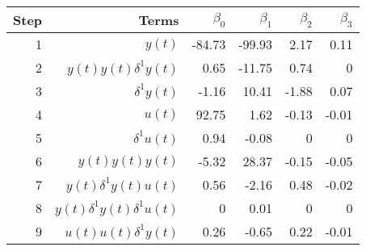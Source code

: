 \begin{tabular}{rrrrrr}
Step & Terms & $\beta_{0}$ & $\beta_{1}$ & $\beta_{2}$ & $\beta_{3}$ \\ 
\hline 
1 & $y(t)$ & -84.73 & -99.93 & 2.17 & 0.11 \\ 
2 & $y(t)y(t)\delta^1 y(t)$ & 0.65 & -11.75 & 0.74 & 0 \\ 
3 & $\delta^1 y(t)$ & -1.16 & 10.41 & -1.88 & 0.07 \\ 
4 & $u(t)$ & 92.75 & 1.62 & -0.13 & -0.01 \\ 
5 & $\delta^1 u(t)$ & 0.94 & -0.08 & 0 & 0 \\ 
6 & $y(t)y(t)y(t)$ & -5.32 & 28.37 & -0.15 & -0.05 \\ 
7 & $y(t)\delta^1 y(t)u(t)$ & 0.56 & -2.16 & 0.48 & -0.02 \\ 
8 & $y(t)\delta^1 y(t)\delta^1 u(t)$ & 0 & 0.01 & 0 & 0 \\ 
9 & $u(t)u(t)\delta^1 y(t)$ & 0.26 & -0.65 & 0.22 & -0.01 \\ 
\hline 
\end{tabular}